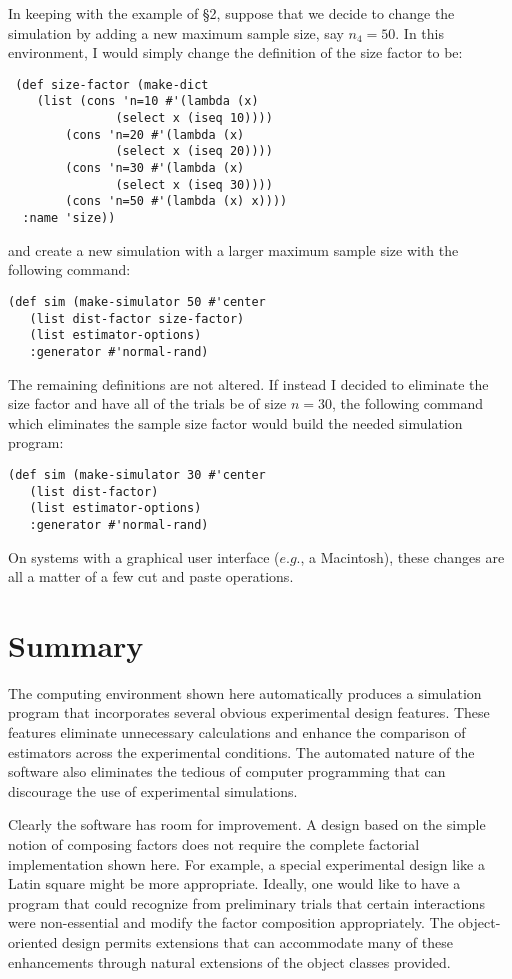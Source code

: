 \vspace{3.in}

In keeping with the example of \S2, suppose that we decide to change
the simulation by adding a new maximum sample size, say $n_4=50$.  In
this environment, I would simply change the definition of the size
factor to be:
\begin{verbatim}
 (def size-factor (make-dict
 	(list (cons 'n=10 #'(lambda (x)
               (select x (iseq 10))))
        (cons 'n=20 #'(lambda (x)
               (select x (iseq 20))))
        (cons 'n=30 #'(lambda (x)
               (select x (iseq 30))))
        (cons 'n=50 #'(lambda (x) x))))
  :name 'size))
\end{verbatim}
\noindent and create a new simulation with a larger maximum sample size
with the following command:
\begin{verbatim}
(def sim (make-simulator 50 #'center
   (list dist-factor size-factor)
   (list estimator-options)
   :generator #'normal-rand)
\end{verbatim}
\noindent The remaining definitions are not altered.  If instead I
decided to eliminate the size factor and have all
of the trials be of size $n=30$, the following command which eliminates
the sample size factor would build the needed simulation program:
\begin{verbatim}
(def sim (make-simulator 30 #'center
   (list dist-factor)
   (list estimator-options)
   :generator #'normal-rand)
\end{verbatim}
On systems with a graphical user interface ($e.g.$, a Macintosh),
these changes are all a matter of a few cut and paste operations.



\section{Summary}

The computing environment shown here automatically produces a simulation
program that incorporates several obvious experimental design
features.  These features eliminate unnecessary calculations and
enhance the comparison of estimators across the experimental
conditions. The automated nature of the software also eliminates the
tedious of computer programming that can discourage the use
of experimental simulations.


Clearly the software has room for improvement.  A design based on
the simple notion of composing factors does not require the
complete factorial implementation shown here.  For example, a special
experimental design like a Latin square might be more appropriate. 
Ideally, one would like to have a program that could recognize from
preliminary trials that certain interactions were non-essential and
modify the factor composition appropriately.  The object-oriented
design permits extensions that can accommodate many of these
enhancements through natural extensions of the object classes provided.


